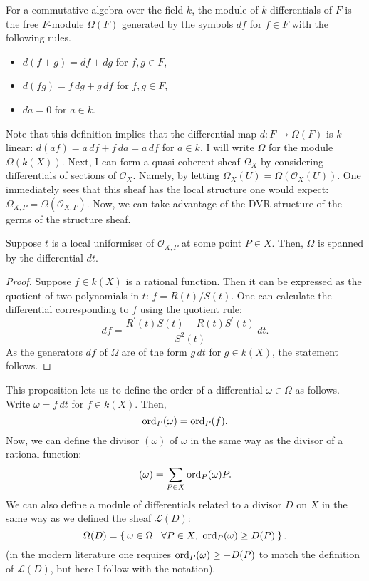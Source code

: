 \begin{defin}
  For a commutative algebra over the field $k$, the module of
  $k$-differentials of $F$ is the free $F$-module $\Omega(F)$ generated
  by the symbols $df$ for $f\in F$ with the following rules.
  \begin{itemize}
    \item $d(f+g)=df+dg$ for $f, g\in F$,
    \item $d(fg)=f\,dg+g\,df$ for $f, g\in F$,
    \item $da = 0$ for $a\in k$.
  \end{itemize}
\end{defin}
Note that this definition implies that the differential map $d:F\to\Omega(F)$
is $k$-linear: $d(af)=a\,df+f\,da=a\,df$ for $a\in k$. I will write
$\Omega$ for the module $\Omega\left(k(X)\right)$. Next, I can form a
quasi-coherent sheaf $\Omega_{X}$ by considering differentials of sections of
$\mathscr{O}_{X}$. Namely, by letting
$\Omega_{X}(U)=\Omega\left(\mathscr{O}_{X}(U)\right)$. One
immediately sees that this sheaf has the local structure one would expect:
$\Omega_{X,P}=\Omega\left(\mathscr{O}_{X,P}\right)$. Now, we can take
advantage of the DVR structure of the germs of the structure sheaf.
\begin{prop}
  Suppose $t$ is a local uniformiser of $\mathscr{O}_{X,P}$ at some
  point $P\in X$. Then, $\Omega$ is spanned by the differential $dt$.
\end{prop}
\begin{proof}
  Suppose $f\in k(X)$ is a rational function. Then it can be expressed as
  the quotient of two polynomials in $t$: $f=R(t)/S(t)$. One can calculate
  the differential corresponding to $f$ using the quotient rule:
  \[
    df = \frac{R^{\prime}(t)S(t)-R(t)S^{\prime}(t)}{S^{2}(t)}\,dt.
  \]
  As the generators $df$ of $\Omega$ are of the form $g\,dt$ for $g\in k(X)$,
  the statement follows.
\end{proof}
This proposition lets us to define the order of a differential
$\omega\in\Omega$ as follows. Write $\omega=f\,dt$ for $f\in k(X)$. Then,
\[
  \operatorname{ord}_{P}(\omega)=\operatorname{ord}_{P}(f).
\]
Now, we can define the divisor $(\omega)$ of $\omega$ in the same way as
the divisor of a rational function:
\[
  (\omega)=\sum_{P\in X}\operatorname{ord}_{P}(\omega)P.
\]
We can also define a module of differentials related to a divisor $D$
on $X$ in the same way as we defined the sheaf $\mathcal{L}(D)$:
\[
  \Omega(D)=\Set{\omega\in\Omega\mid \forall P\in X,\ \operatorname{ord}_{P}(\omega)
  \geq D(P)}.
\]
(in the modern literature one requires $\operatorname{ord}_{P}(\omega)\geq -D(P)$
to match the definition of $\mathcal{L}(D)$, but here I follow \cite{serre}
with the notation).

